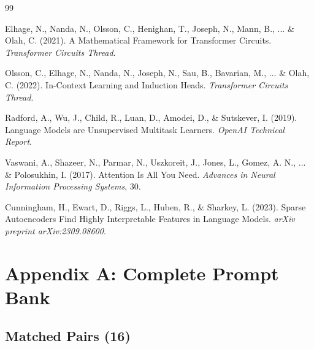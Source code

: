 \documentclass[12pt,a4paper]{article}
\begin{document}
\begin{thebibliography}{99}

\item[Anthropic 2021] Elhage, N., Nanda, N., Olsson, C., Henighan, T., Joseph, N., Mann, B., ... \& Olah, C. (2021). A Mathematical Framework for Transformer Circuits. \textit{Transformer Circuits Thread}.

\item[Anthropic 2022] Olsson, C., Elhage, N., Nanda, N., Joseph, N., Sau, B., Bavarian, M., ... \& Olah, C. (2022). In-Context Learning and Induction Heads. \textit{Transformer Circuits Thread}.

\item[GPT-2] Radford, A., Wu, J., Child, R., Luan, D., Amodei, D., \& Sutskever, I. (2019). Language Models are Unsupervised Multitask Learners. \textit{OpenAI Technical Report}.

\item[Transformer] Vaswani, A., Shazeer, N., Parmar, N., Uszkoreit, J., Jones, L., Gomez, A. N., ... \& Polosukhin, I. (2017). Attention Is All You Need. \textit{Advances in Neural Information Processing Systems}, 30.

\item[SAE] Cunningham, H., Ewart, D., Riggs, L., Huben, R., \& Sharkey, L. (2023). Sparse Autoencoders Find Highly Interpretable Features in Language Models. \textit{arXiv preprint arXiv:2309.08600}.

\end{thebibliography}

\appendix

\section{Appendix A: Complete Prompt Bank}

\subsection{Matched Pairs (16)}
\end{document}
